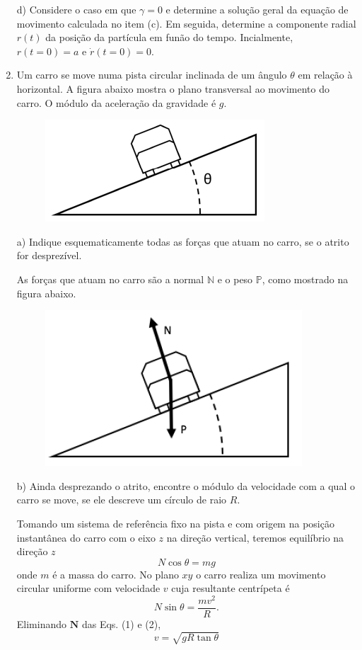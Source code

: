 \begin{enumerate}[start=1,label={\bfseries Q\arabic*.}]
\resposta

d) Considere o caso em que $\gamma = 0$ e determine a solução geral da equação de movimento calculada no item (c). Em seguida, determine a componente radial $r(t)$ da posição da partícula em funão do tempo. Incialmente, $r(t=0)=a$ e $\dot{r}(t=0)=0$.

\resposta




\item Um carro se move numa pista circular inclinada de um ângulo $\theta$ em relação à horizontal. A figura abaixo mostra o plano transversal ao movimento do carro. O módulo da aceleração da gravidade é $g$.
\begin{figure}[H]
\centering
\includegraphics[scale=0.8]{classica-img/inclina}
\end{figure}



a) Indique esquematicamente todas as forças que atuam no carro, se o atrito for desprezível.

\resposta As forças que atuam no carro são a normal $\mathbb{N}$ e o peso $\mathbb{P}$, como mostrado na figura abaixo.
\begin{figure}[H]
\centering
\includegraphics[scale=0.8]{classica-img/inclina1}
\end{figure}


b) Ainda desprezando o atrito, encontre o módulo da velocidade com a qual o carro se move, se ele descreve um círculo de raio $R$.

\resposta Tomando um sistema de referência fixo na pista e com origem na posição instantânea do carro com o eixo $z$ na direção vertical, teremos equilíbrio na direção $z$
$$
N \cos \theta = m g
$$
onde $m$ é a massa do carro. No plano $xy$ o carro realiza um movimento circular uniforme com velocidade $v$ cuja resultante centrípeta é
$$
N \sin \theta = \frac{mv^{2}}{R}.
$$
Eliminando $\mathbf{N}$ das Eqs. (1) e (2),
$$
v = \sqrt{gR\tan \theta}
$$


\end{enumerate}
